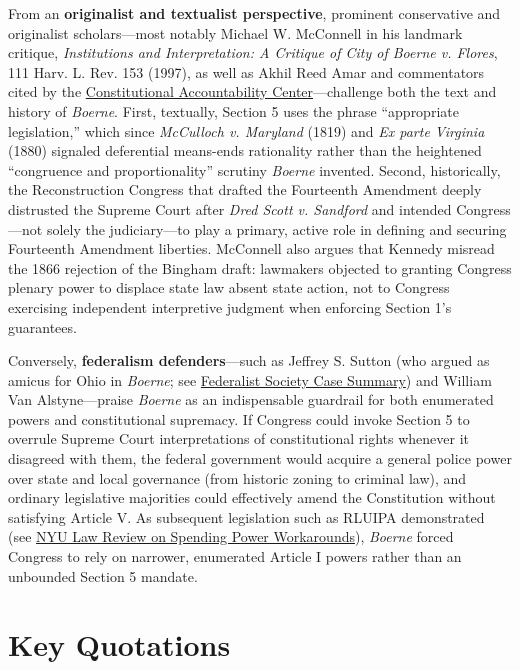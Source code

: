 \documentclass[12pt]{article}
\begin{document}
From an \textbf{originalist and textualist perspective}, prominent conservative and originalist scholars---most notably Michael W. McConnell in his landmark critique, \textit{Institutions and Interpretation: A Critique of City of Boerne v. Flores}, 111 Harv. L. Rev. 153 (1997), as well as Akhil Reed Amar and commentators cited by the \href{https://www.theusconstitution.org/wp-content/uploads/2017/12/Shield_of_National_Protection.pdf}{Constitutional Accountability Center}---challenge both the text and history of \textit{Boerne}. First, textually, Section 5 uses the phrase ``appropriate legislation,'' which since \textit{McCulloch v. Maryland} (1819) and \textit{Ex parte Virginia} (1880) signaled deferential means-ends rationality rather than the heightened ``congruence and proportionality'' scrutiny \textit{Boerne} invented. Second, historically, the Reconstruction Congress that drafted the Fourteenth Amendment deeply distrusted the Supreme Court after \textit{Dred Scott v. Sandford} and intended Congress---not solely the judiciary---to play a primary, active role in defining and securing Fourteenth Amendment liberties. McConnell also argues that Kennedy misread the 1866 rejection of the Bingham draft: lawmakers objected to granting Congress plenary power to displace state law absent state action, not to Congress exercising independent interpretive judgment when enforcing Section 1's guarantees.

Conversely, \textbf{federalism defenders}---such as Jeffrey S. Sutton (who argued as amicus for Ohio in \textit{Boerne}; see \href{https://fedsoc.org/case/city-of-boerne-v-flores}{Federalist Society Case Summary}) and William Van Alstyne---praise \textit{Boerne} as an indispensable guardrail for both enumerated powers and constitutional supremacy. If Congress could invoke Section 5 to overrule Supreme Court interpretations of constitutional rights whenever it disagreed with them, the federal government would acquire a general police power over state and local governance (from historic zoning to criminal law), and ordinary legislative majorities could effectively amend the Constitution without satisfying Article V. As subsequent legislation such as RLUIPA demonstrated (see \href{https://nyulawreview.org/wp-content/uploads/2018/08/NYULawReview-75-2-Proctor.pdf}{NYU Law Review on Spending Power Workarounds}), \textit{Boerne} forced Congress to rely on narrower, enumerated Article I powers rather than an unbounded Section 5 mandate.

\section{Key Quotations}
\end{document}
